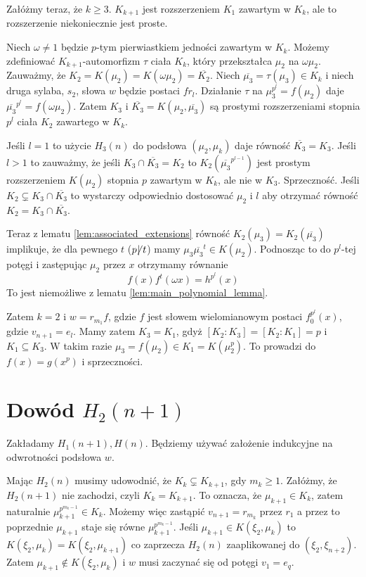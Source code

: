 Załóżmy teraz, że $k \geq 3$. $K_{k+1}$ jest rozszerzeniem $K_1$ zawartym w
$K_k$, ale to rozszerzenie niekoniecznie jest proste.

Niech $\omega \neq 1$ będzie $p$-tym pierwiastkiem jedności zawartym w $K_k$.
Możemy zdefiniować $K_{k+1}$-automorfizm $\tau$ ciała $K_k$, który przekształca
$\mu_2$ na $\omega \mu_2$.
Zauważmy, że $K_2 = K\left(\mu_2\right) = K\left(\omega \mu_2\right) =
\overline{K_2}$.
Niech $\overline{\mu_3} = \tau(\mu_3) \in K_k$ i niech druga sylaba, $s_2$,
słowa $w$ będzie postaci $fr_l$.
Działanie $\tau$ na $\mu_3^{p^l} = f\left(\mu_2\right)$ daje
$\overline{\mu_3}^{p^l} = f\left(\omega\mu_2\right)$. Zatem $K_3$ i
$\overline{K_3} = K\left(\mu_2, \overline{\mu_3}\right)$ są prostymi
rozszerzeniami stopnia $p^l$ ciała $K_2$ zawartego w $K_k$.

Jeśli $l = 1$ to użycie $H_3(n)$ do podsłowa $\left(\mu_2, \mu_k\right)$ daje
równość $\overline{K_3} = K_3$. Jeśli $l > 1$ to zauważmy, że jeśli $K_3 \cap
\overline{K_3} = K_2$ to $K_2\left(\overline{\mu_3}^{p^{l-1}}\right)$ jest
prostym rozszerzeniem $K\left(\mu_2\right)$ stopnia $p$ zawartym w $K_k$, ale
nie w $K_3$. Sprzeczność. Jeśli $K_2 \subsetneq K_3 \cap \overline{K_3}$ to
wystarczy odpowiednio dostosować $\mu_2$ i $l$ aby otrzymać równość
$K_2 = K_3 \cap \overline{K_3}$.

Teraz z lematu \ref{lem:associated_extensions} równość $K_2\left(\mu_3\right) =
K_2\left(\overline{\mu_3}\right)$ implikuje, że dla pewnego $t$ 
($p \!\! \not \! | \; t$)
mamy $\mu_3\overline{\mu_3}^t \in K\left(\mu_2\right)$. Podnosząc to do
$p^l$-tej potęgi i zastępując $\mu_2$ przez $x$ otrzymamy równanie
\[ f(x)f^t(\omega x) = h^{p^l}(x)\]
To jest niemożliwe z lematu \ref{lem:main_polynomial_lemma}. 

Zatem $k = 2$ i $w = r_{m_1}f$, gdzie $f$ jest słowem wielomianowym postaci
$f_0^{p^l}(x)$, gdzie $v_{n+1} = e_l$. Mamy zatem $K_3 = K_1$, gdyż 
$\left[K_2 : K_3\right] = \left[K_2 : K_1\right] = p$ i $K_1 \subseteq K_3$.
W takim razie $\mu_3 = f\left(\mu_2\right) \in K_1 = K\left(\mu_2^p\right)$. To
prowadzi do $f(x) = g\left(x^p\right)$ i sprzeczności.

\section{Dowód $H_2(n+1)$}
Zakładamy $H_1(n+1), H(n)$. Będziemy używać założenie indukcyjne na odwrotności
podsłowa $w$.

Mając $H_2(n)$ musimy udowodnić, że $K_k \subsetneq K_{k+1}$, gdy $m_k \geq 1$.
Załóżmy, że $H_2(n+1)$ nie zachodzi, czyli $K_k = K_{k+1}$. To oznacza, że
$\mu_{k+1} \in K_k$, zatem naturalnie $\mu_{k+1}^{p^{m_k -1}} \in K_k$. Możemy
więc zastąpić $v_{n + 1} = r_{m_k}$ przez $r_1$ a przez to poprzednie
$\mu_{k+1}$ staje się równe $\mu_{k+1}^{p^{m_k - 1}}$.
Jeśli $\mu_{k+1} \in K\left(\xi_2, \mu_k\right)$ to $K\left(\xi_2, \mu_k\right)
= K\left(\xi_2, \mu_{k+1}\right)$ co zaprzecza $H_2(n)$ zaaplikowanej do
$\left(\xi_2, \xi_{n+2}\right)$. Zatem $\mu_{k+1} \not \in K\left(\xi_2,
\mu_k\right)$ i $w$ musi zaczynać się od potęgi $v_1 = e_q$.

